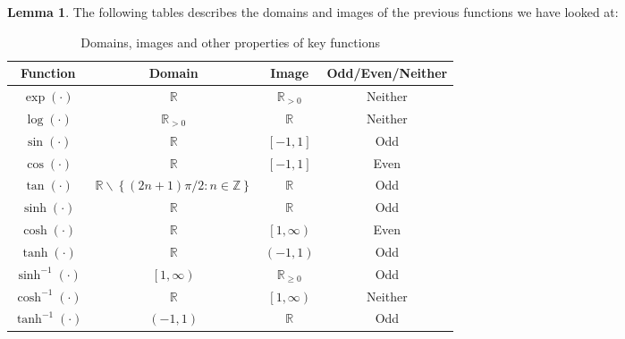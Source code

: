 \documentclass[11pt]{article}
\theoremstyle{definition}
\newtheorem{lemma}[prop]{Lemma}
\newcommand{\brac}[1]{\left(#1\right)}
\newcommand{\sqbrac}[1]{\left[#1\right]}
\newcommand{\curlbrac}[1]{\left\{#1\right\}}
\newcommand{\R}{\mathbb{R}}
\newcommand{\Z}{\mathbb{Z}}
\begin{document}
	\begin{lemma}
		The following tables describes the domains and images of the previous functions we have looked at:
		\begin{table}[H]
			\centering
			\begin{tabular}{c|c|c|c}
				{\bf Function} & {\bf Domain} & {\bf Image} & {\bf Odd/Even/Neither }\\\hline
				$\exp\brac{\cdot}$ & $\R$ & $\R_{>0}$& Neither\\\hline
				$\log\brac{\cdot}$ & $\R_{>0}$ & $\R$ & Neither\\\hline
				$\sin\brac{\cdot}$ & $\R$ & $\sqbrac{-1,1}$ & Odd\\\hline
				$\cos\brac{\cdot}$ & $\R$ & $\sqbrac{-1,1}$ & Even\\\hline
				$\tan\brac{\cdot}$ & $\R\backslash\curlbrac{\brac{2n+1}\pi/2:n\in \Z}$ & $\R$ & Odd\\\hline
				$\sinh\brac{\cdot}$ & $\R$ & $\R$ & Odd\\\hline
				$\cosh\brac{\cdot}$ & $\R$ & $\left[1,\infty\right)$ & Even\\\hline
				$\tanh\brac{\cdot}$ & $\R$ & $\brac{-1,1}$ & Odd\\\hline
				$\sinh^{-1}\brac{\cdot}$ & $\left[1,\infty\right)$ & $\R_{\geq 0}$ & Odd\\\hline
				$\cosh^{-1}\brac{\cdot}$ & $\R$ & $\left[1,\infty\right)$ & Neither\\\hline
				$\tanh^{-1}\brac{\cdot}$ &$\brac{-1,1}$& $\R$ & Odd\\
			\end{tabular}
			\caption{Domains, images and other properties of key functions}
			\label{domImFunc}
		\end{table}
	\end{lemma}
\end{document}
